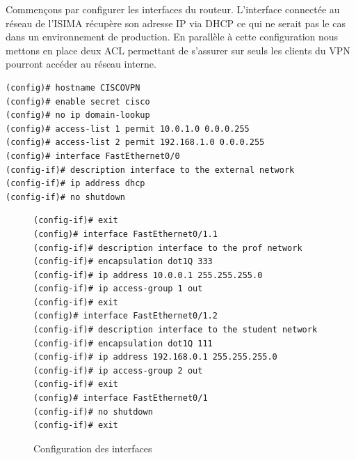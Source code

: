 Commençons par configurer les interfaces du routeur. L'interface connectée au réseau de l'ISIMA récupère son adresse IP via DHCP ce qui ne serait pas le cas dans un environnement de production. En parallèle à cette configuration nous mettons en place deux ACL permettant de s'assurer sur seuls les clients du VPN pourront accéder au réseau interne.
	\begin{center}
		\begin{minipage}{0.90\textwidth}
			\begin{lstlisting}[frame=trBL]
(config)# hostname CISCOVPN
(config)# enable secret cisco
(config)# no ip domain-lookup
(config)# access-list 1 permit 10.0.1.0 0.0.0.255
(config)# access-list 2 permit 192.168.1.0 0.0.0.255
(config)# interface FastEthernet0/0
(config-if)# description interface to the external network
(config-if)# ip address dhcp
(config-if)# no shutdown
			\end{lstlisting}
		\end{minipage}
	\end{center}
\begin{figure}[H]
	\begin{center}
		\begin{minipage}{0.90\textwidth}
			\begin{lstlisting}[frame=trBL]
(config-if)# exit
(config)# interface FastEthernet0/1.1
(config-if)# description interface to the prof network
(config-if)# encapsulation dot1Q 333
(config-if)# ip address 10.0.0.1 255.255.255.0
(config-if)# ip access-group 1 out
(config-if)# exit
(config)# interface FastEthernet0/1.2
(config-if)# description interface to the student network
(config-if)# encapsulation dot1Q 111
(config-if)# ip address 192.168.0.1 255.255.255.0
(config-if)# ip access-group 2 out
(config-if)# exit
(config)# interface FastEthernet0/1
(config-if)# no shutdown
(config-if)# exit
			\end{lstlisting}
		\end{minipage}
	\end{center}
	\caption{Configuration des interfaces}
	\label{configuration_interfaces}
\end{figure}

~

